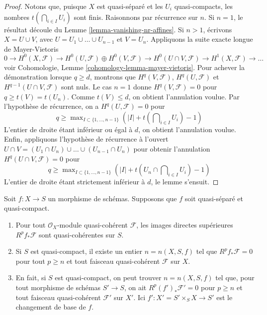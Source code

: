 \begin{proof}
Notons que, puisque $X$ est quasi-séparé et les $U_i$ quasi-compacts, les nombres
$t(\bigcap_{i \in I} U_i)$ sont finis. Raisonnons par récurrence sur $n$.
Si $n = 1$, le résultat découle du Lemme \ref{lemma-vanishing-nr-affines}.
Si $n > 1$, écrivons $X = U \cup V$, avec $U = U_1 \cup \ldots \cup U_{n - 1}$
et $V = U_n$. Appliquons la suite exacte longue de Mayer-Vietoris
$$
0 \to
H^0(X, \mathcal{F}) \to
H^0(U, \mathcal{F}) \oplus H^0(V, \mathcal{F}) \to
H^0(U \cap V, \mathcal{F}) \to
H^1(X, \mathcal{F}) \to \ldots
$$
voir Cohomologie, Lemme \ref{cohomology-lemma-mayer-vietoris}.
Pour achever la démonstration lorsque $q \geq d$, montrons que
$H^q(V, \mathcal{F})$, $H^q(U, \mathcal{F})$ et
$H^{q - 1}(U \cap V, \mathcal{F})$ sont nuls.
Le cas $n = 1$ donne $H^q(V, \mathcal{F}) = 0$ pour
$q \geq t(V) = t(U_n)$. Comme $t(V) \leq d$, on obtient l'annulation voulue.
Par l'hypothèse de récurrence, on a $H^q(U, \mathcal{F}) = 0$ pour
$$
q \geq \max\nolimits_{I \subset \{1, \ldots, n - 1\}}
\left(|I| + t(\bigcap\nolimits_{i \in I} U_i) - 1\right)
$$
L'entier de droite étant inférieur ou égal à $d$, on obtient
l'annulation voulue. Enfin, appliquons l'hypothèse de récurrence à l'ouvert
$U \cap V = (U_1 \cap U_n) \cup \ldots \cup (U_{n - 1} \cap U_n)$ pour obtenir
l'annulation $H^q(U \cap V, \mathcal{F}) = 0$ pour
$$
q \geq \max\nolimits_{I \subset \{1, \ldots, n - 1\}}
\left(|I| + t(U_n \cap \bigcap\nolimits_{i \in I} U_i) - 1\right)
$$
L'entier de droite étant strictement inférieur à $d$,
le lemme s'ensuit.
\end{proof}

\begin{lemma}
\label{lemma-quasi-coherence-higher-direct-images}
Soit $f : X \to S$ un morphisme de schémas.
Supposons que $f$ soit quasi-séparé et quasi-compact.
\begin{enumerate}
\item Pour tout $\mathcal{O}_X$-module quasi-cohérent $\mathcal{F}$, les
images directes supérieures $R^pf_*\mathcal{F}$ sont quasi-cohérentes sur $S$.
\item Si $S$ est quasi-compact, il existe un entier $n = n(X, S, f)$
tel que $R^pf_*\mathcal{F} = 0$ pour tout $p \geq n$ et tout
faisceau quasi-cohérent $\mathcal{F}$ sur $X$.
\item En fait, si $S$ est quasi-compact, on peut trouver $n = n(X, S, f)$
tel que, pour tout
morphisme de schémas $S' \to S$, on ait $R^p(f')_*\mathcal{F}' = 0$
pour $p \geq n$ et tout faisceau quasi-cohérent $\mathcal{F}'$
sur $X'$. Ici $f' : X' = S' \times_S X \to S'$ est le changement de base de $f$.
\end{enumerate}
\end{lemma}

